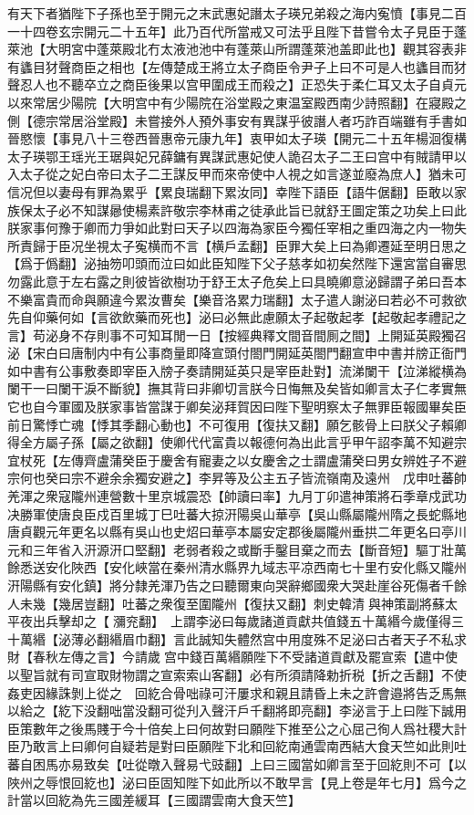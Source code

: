 有天下者猶陛下子孫也至于開元之末武惠妃譖太子瑛兄弟殺之海内寃憤【事見二百一十四卷玄宗開元二十五年】此乃百代所當戒又可法乎且陛下昔嘗令太子見臣于蓬萊池【大明宮中蓬萊殿北冇太液池池中有蓬萊山所謂蓬萊池盖即此也】觀其容表非有蠭目犲聲商臣之相也【左傳楚成王將立太子商臣令尹子上曰不可是人也蠭目而犲聲忍人也不聽卒立之商臣後果以宫甲圍成王而殺之】正恐失于柔仁耳又太子自貞元以來常居少陽院【大明宫中有少陽院在浴堂殿之東温室殿西南少詩照翻】在寢殿之側【德宗常居浴堂殿】未嘗接外人預外事安有異謀乎彼譖人者巧詐百端雖有手書如晉愍懷【事見八十三卷西晉惠帝元康九年】衷甲如太子瑛【開元二十五年楊洄復構太子瑛鄂王瑶光王琚與妃兄薛鏞有異謀武惠妃使人詭召太子二王曰宫中有賊請甲以入太子從之妃白帝曰太子二王謀反甲而來帝使中人視之如言遂並廢為庶人】猶未可信况但以妻母有罪為累乎【累良瑞翻下累汝同】幸陛下語臣【語牛倨翻】臣敢以家族保太子必不知謀曏使楊素許敬宗李林甫之徒承此旨已就舒王圖定策之功矣上曰此朕家事何豫于卿而力爭如此對曰天子以四海為家臣今獨任宰相之重四海之内一物失所責歸于臣况坐視太子寃横而不言【横戶孟翻】臣罪大矣上曰為卿遷延至明日思之【爲于僞翻】泌抽笏叩頭而泣曰如此臣知陛下父子慈孝如初矣然陛下還宮當自審思勿露此意于左右露之則彼皆欲樹功于舒王太子危矣上曰具曉卿意泌歸謂子弟曰吾本不樂富貴而命與願違今累汝曹矣【樂音洛累力瑞翻】太子遣人謝泌曰若必不可救欲先自仰藥何如【言欲飲藥而死也】泌曰必無此慮願太子起敬起孝【起敬起孝禮記之言】苟泌身不存則事不可知耳閒一日【按經典釋文間音間厠之間】上開延英殿獨召泌【宋白曰唐制内中有公事商量即降宣頭付閤門開延英閤門翻宣申中書并牓正衙門如中書有公事敷奏即宰臣入牓子奏請開延英只是宰臣赴對】流涕闌干【泣涕縱横為闌干一曰闌干淚不斷貌】撫其背曰非卿切言朕今日悔無及矣皆如卿言太子仁孝實無它也自今軍國及朕家事皆當謀于卿矣泌拜賀因曰陛下聖明察太子無罪臣報國畢矣臣前日驚悸亡魂【悸其季翻心動也】不可復用【復扶又翻】願乞骸骨上曰朕父子賴卿得全方屬子孫【屬之欲翻】使卿代代富貴以報德何為出此言乎甲午詔李萬不知避宗宜杖死【左傳齊盧蒲癸臣于慶舍有寵妻之以女慶舍之士謂盧蒲癸曰男女辨姓子不避宗何也癸曰宗不避余余獨安避之】李昇等及公主五子皆流嶺南及遠州　戊申吐蕃帥羌渾之衆寇隴州連營數十里京城震恐【帥讀曰率】九月丁卯遣神策將石季章戍武功决勝軍使唐良臣戍百里城丁巳吐蕃大掠汧陽吳山華亭【吳山縣屬隴州隋之長蛇縣地唐貞觀元年更名以縣有吳山也史炤曰華亭本屬安定郡後屬隴州垂拱二年更名曰亭川元和三年省入汧源汧口堅翻】老弱者殺之或斷手鑿目棄之而去【斷音短】驅丁壯萬餘悉送安化陜西【安化峽當在秦州清水縣界九域志平凉西南七十里冇安化縣又隴州汧陽縣有安化鎮】將分隸羌渾乃告之曰聽爾東向哭辭鄉國衆大哭赴崖谷死傷者千餘人未幾【幾居豈翻】吐蕃之衆復至圍隴州【復扶又翻】刺史韓清與神策副將蘇太平夜出兵擊却之【瀰兖翻】　上謂李泌曰每歲諸道貢獻共值錢五十萬緡今歲僅得三十萬緡【泌薄必翻緡眉巾翻】言此誠知失體然宫中用度殊不足泌曰古者天子不私求財【春秋左傳之言】今請歲宫中錢百萬緡願陛下不受諸道貢獻及罷宣索【遣中使以聖旨就有司宣取財物謂之宣索索山客翻】必有所須請降勅折税【折之舌翻】不使姦吏因緣誅剝上從之　回紇合骨咄祿可汗屢求和親且請昏上未之許會邉將告乏馬無以給之【紇下没翻咄當没翻可從刋入聲汗戶千翻將即亮翻】李泌言于上曰陛下誠用臣策數年之後馬賤于今十倍矣上曰何故對曰願陛下推至公之心屈己徇人爲社稷大計臣乃敢言上曰卿何自疑若是對曰臣願陛下北和回紇南通雲南西結大食天竺如此則吐蕃自困馬亦易致矣【吐從暾入聲易弋豉翻】上曰三國當如卿言至于回紇則不可【以陜州之辱恨回紇也】泌曰臣固知陛下如此所以不敢早言【見上卷是年七月】爲今之計當以回紇為先三國差緩耳【三國謂雲南大食天竺】